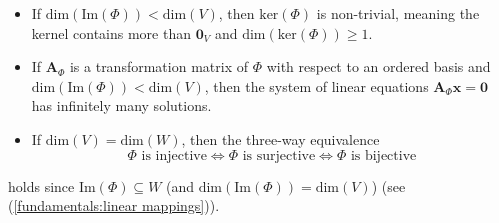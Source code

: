 \documentclass{report}
\begin{document}
\begin{itemize}
\item If $\text{dim}(\text{Im}(\Phi))<\text{dim}(V)$, then $\text{ker}(\Phi)$ is non-trivial, 
meaning the kernel contains more than $\mathbf{0}_V$ and $\text{dim}(\text{ker}(\Phi))\geq1$.
\item If $\bm{A}_\Phi$ is a transformation matrix of $\Phi$ with respect to an ordered basis and 
$\text{dim}(\text{Im}(\Phi))<\text{dim}(V)$, then the system of linear equations $\bm{A}_\Phi\bm{x}=\mathbf{0}$
has infinitely many solutions.
\item If $\text{dim}(V)=\text{dim}(W)$, then the three-way equivalence
\begin{equation*}
\Phi\text{ is injective}\iff\Phi\text{ is surjective}\iff\Phi\text{ is bijective}
\end{equation*}
\end{itemize}
holds since $\text{Im}(\Phi)\subseteq W$ (and $\text{dim}(\text{Im}(\Phi))
=\text{dim}(V)$) (see (\ref{fundamentals:linear mappings})).
\newpage
\end{document}
